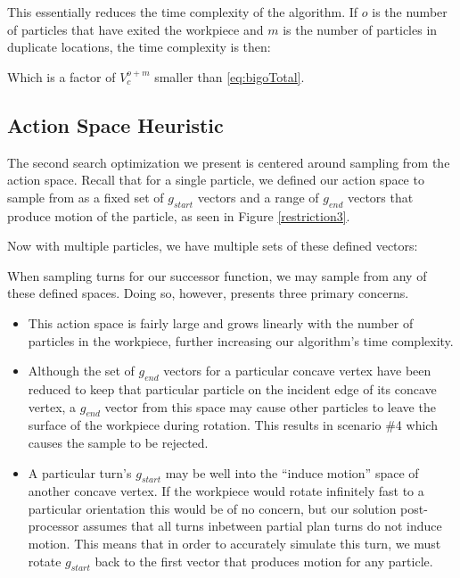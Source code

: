 This essentially reduces the time complexity of the algorithm. If $o$ is the number of particles that have exited the workpiece and $m$ is the number of particles in duplicate locations, the time complexity is then:

 {
  \label{eq:bigoTotalWithHeuristic}
}

Which is a factor of $V_{c}^{o + m}$ smaller than \eqref{eq:bigoTotal}.

\subsection{Action Space Heuristic}

The second search optimization we present is centered around sampling from the action space. Recall that for a single particle, we defined our action space to sample from as a fixed set of $g_{start}$ vectors and a range of $g_{end}$ vectors that produce motion of the particle, as seen in Figure \ref{restriction3}.

Now with multiple particles, we have multiple sets of these defined vectors:


When sampling turns for our successor function, we may sample from any of these defined spaces. Doing so, however, presents three primary concerns.

\begin{itemize}
\item This action space is fairly large and grows linearly with the number of particles in the workpiece, further increasing our algorithm's time complexity.
\item Although the set of $g_{end}$ vectors for a particular concave vertex have been reduced to keep that particular particle on the incident edge of its concave vertex, a $g_{end}$ vector from this space may cause other particles to leave the surface of the workpiece during rotation. This results in scenario \#4 which causes the sample to be rejected.
\item A particular turn's $g_{start}$ may be well into the ``induce motion'' space of another concave vertex. If the workpiece would rotate infinitely fast to a particular orientation this would be of no concern, but our solution post-processor assumes that all turns inbetween partial plan turns do not induce motion. This means that in order to accurately simulate this turn, we must rotate $g_{start}$ back to the first vector that produces motion for any particle.
\end{itemize}

